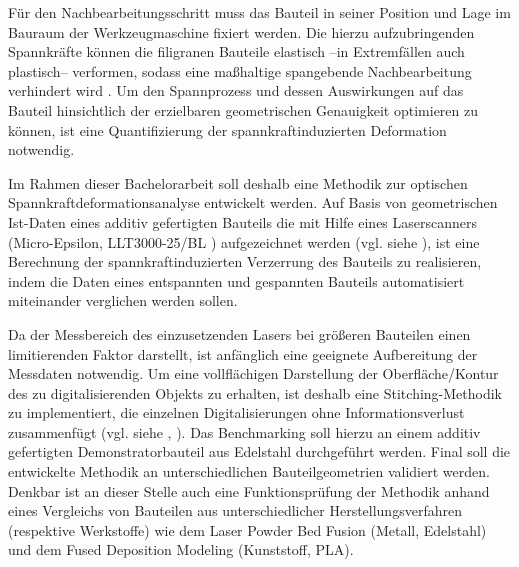 \documentclass[../main.tex]{subfiles}
\begin{document}
Für den Nachbearbeitungsschritt muss das Bauteil in seiner Position und Lage im Bauraum der
Werkzeugmaschine fixiert werden. Die hierzu aufzubringenden Spannkräfte können die filigranen
Bauteile elastisch –in Extremfällen auch plastisch– verformen, sodass eine maßhaltige
spangebende Nachbearbeitung verhindert wird \cite{newMethod}. Um den Spannprozess und dessen
Auswirkungen auf das Bauteil hinsichtlich der erzielbaren geometrischen Genauigkeit optimieren
zu können, ist eine Quantifizierung der spannkraftinduzierten Deformation notwendig.
\newline

Im Rahmen dieser Bachelorarbeit soll deshalb eine Methodik zur optischen
Spannkraftdeformationsanalyse entwickelt werden. Auf Basis von geometrischen Ist-Daten eines
additiv gefertigten Bauteils die mit Hilfe eines Laserscanners (Micro-Epsilon, LLT3000-25/BL
\cite{MESSTECHNIK_2020}) aufgezeichnet werden (vgl. siehe \cite{Potthoff.2023}), ist eine Berechnung der
spannkraftinduzierten Verzerrung des Bauteils zu realisieren, indem die Daten eines entspannten
und gespannten Bauteils automatisiert miteinander verglichen werden sollen.
\newline

Da der Messbereich des einzusetzenden Lasers bei größeren Bauteilen einen limitierenden Faktor
darstellt, ist anfänglich eine geeignete Aufbereitung der Messdaten notwendig. Um eine
vollflächigen Darstellung der Oberfläche/Kontur des zu digitalisierenden Objekts zu erhalten, ist
deshalb eine Stitching-Methodik zu implementiert, die einzelnen Digitalisierungen ohne
Informationsverlust zusammenfügt (vgl. siehe \cite{SusanaBrandao.2014}, \cite{Sun.2021}). Das Benchmarking soll hierzu an einem
additiv gefertigten Demonstratorbauteil aus Edelstahl durchgeführt werden. Final soll die
entwickelte Methodik an unterschiedlichen Bauteilgeometrien validiert werden. Denkbar ist an
dieser Stelle auch eine Funktionsprüfung der Methodik anhand eines Vergleichs von Bauteilen aus
unterschiedlicher Herstellungsverfahren (respektive Werkstoffe) wie dem Laser Powder Bed
Fusion (Metall, Edelstahl) und dem Fused Deposition Modeling (Kunststoff, PLA).
\end{document}
